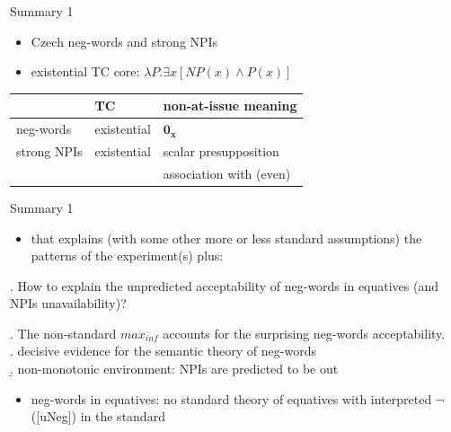 \documentclass[
  ignorenonframetext,
]{beamer}
\providecommand{\tightlist}{%
  \setlength{\itemsep}{0pt}\setlength{\parskip}{0pt}}
\begin{document}
\begin{frame}
\begin{block}{Summary 1}
\protect\hypertarget{summary-1}{}
\begin{itemize}
\tightlist
\item
  Czech neg-words and strong NPIs
\item
  existential TC core: \(\lambda P.\exists x[NP(x) \wedge P(x)]\)
\end{itemize}

\begin{longtable}[]{@{}lll@{}}
\toprule()
& TC & non-at-issue meaning \\
\midrule()
\endhead
neg-words & existential & \(\mathbf{0_x}\) \\
strong NPIs & existential & scalar presupposition \\
& & association with (even) \\
\bottomrule()
\end{longtable}
\end{block}
\end{frame}

\begin{frame}
\begin{block}{Summary 1}
\protect\hypertarget{summary-1-1}{}
\begin{itemize}
\tightlist
\item
  that explains (with some other more or less standard assumptions) the
  patterns of the experiment(s) plus:
\end{itemize}

\ex. How to explain the unpredicted acceptability of neg-words in
equatives (and NPIs unavailability)?

\ex. The non-standard \(max_{inf}\) accounts for the surprising
neg-words acceptability.\\
\a. decisive evidence for the semantic theory of neg-words\\
\b. non-monotonic environment: NPIs are predicted to be out

\begin{itemize}
\tightlist
\item
  neg-words in equatives: no standard theory of equatives with
  interpreted \(\neg\) ({[}uNeg{]}) in the standard
\end{itemize}
\end{block}
\end{frame}
\end{document}
